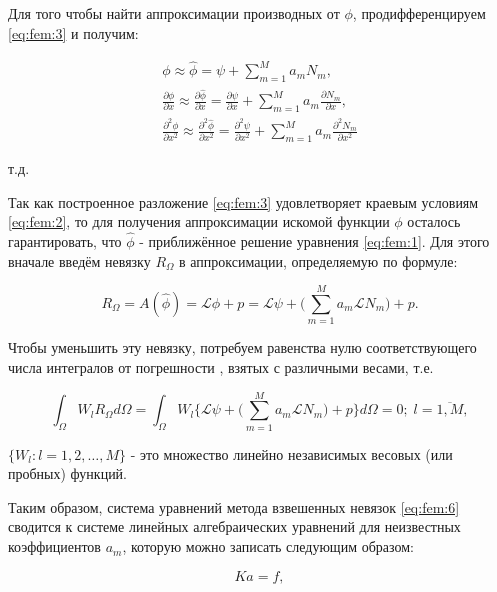 \documentclass[14pt]{extreport}
\begin{document}
Для того чтобы найти аппроксимации производных от $\phi$, продифференцируем \ref{eq:fem:3} и получим:


\begin{gather}
\phi \approx \hat\phi = \psi + \sum\limits_{m=1}^{M} a_mN_m,\nonumber\\
\frac{\partial \phi}{\partial x} \approx \frac{\partial \hat\phi}{\partial x}=\frac{\partial \psi}{\partial x}+\sum\limits_{m=1}^{M} a_m\frac{\partial N_m}{\partial x},\nonumber\\
\frac{\partial^2 \phi}{\partial x^2} \approx \frac{\partial^2 \hat\phi}{\partial x^2}=\frac{\partial^2 \psi}{\partial x^2}+\sum\limits_{m=1}^{M} a_m\frac{\partial^2 N_m}{\partial x^2} \nonumber
\end{gather}

 т.д.

Так как построенное разложение \ref{eq:fem:3} удовлетворяет краевым условиям \ref{eq:fem:2}, то для получения аппроксимации искомой функции $\phi$ осталось гарантировать, что $\hat\phi$ - приближённое решение уравнения \ref{eq:fem:1}. Для этого вначале введём невязку $R_\Omega$ в аппроксимации, определяемую по формуле:

\begin{equation}\label{eq:fem:5}
R_\Omega=A(\hat\phi)=\mathcal L \hat\phi+p=\mathcal L\psi+\bigg(\sum\limits_{m=1}^{M} a_m \mathcal L N_m\bigg) +p.
\end{equation}

Чтобы уменьшить эту невязку, потребуем равенства нулю соответствующего числа интегралов от погрешности \cite{bib:calc:zorich}, взятых с различными весами, т.е.

\begin{equation}\label{eq:fem:6}
\int_\Omega W_l R_\Omega d\Omega = \int_\Omega W_l \bigg\{\mathcal L \psi +\bigg(\sum\limits_{m=1}^{M} a_m \mathcal L N_m\bigg) +p \bigg\} d\Omega =0; \; l=\overline{1,M},
\end{equation}

 $\{W_l:l=1,2,\dots,M\}$ - это множество линейно независимых весовых (или пробных) функций.

Таким образом, система уравнений метода взвешенных невязок \ref{eq:fem:6} сводится к системе линейных алгебраических уравнений для неизвестных коэффициентов $a_m$, которую можно записать следующим образом:

\begin{equation}\label{eq:fem:7}
Ka=f,
\end{equation}
\end{document}
